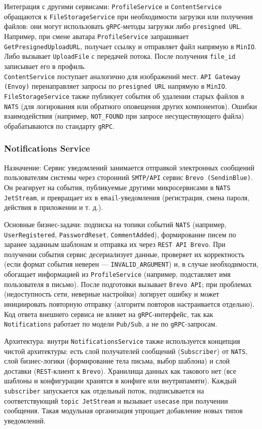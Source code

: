 Интеграция с другими сервисами: \texttt{ProfileService} и \texttt{ContentService} обращаются к \texttt{FileStorageService} при необходимости загрузки или получения файлов: они могут использовать \texttt{gRPC}-методы загрузки либо \texttt{presigned URL}. Например, при смене аватара \texttt{ProfileService} запрашивает \texttt{GetPresignedUploadURL}, получает ссылку и отправляет файл напрямую в \texttt{MinIO}. Либо вызывает \texttt{UploadFile} с передачей потока. После получения \texttt{file\_id} записывает его в профиль. \\ \texttt{ContentService} поступает аналогично для изображений мест. \texttt{API Gateway (Envoy)} перенаправляет запросы по \texttt{presigned URL} напрямую в \texttt{MinIO}. \texttt{FileStorageService} также публикует события об удалении старых файлов в \texttt{NATS} (для логирования или обратного оповещения других компонентов). Ошибки взаимодействия (например, \texttt{NOT\_FOUND} при запросе несуществующего файла) обрабатываются по стандарту \texttt{gRPC}.

\subsubsection*{Notifications Service}
Назначение: Сервис уведомлений занимается отправкой электронных сообщений пользователям системы через сторонний \texttt{SMTP/API} сервис \texttt{Brevo (SendinBlue)}. Он реагирует на события, публикуемые другими микросервисами в \texttt{NATS JetStream}, и превращает их в \texttt{email}-уведомления (регистрация, смена пароля, действия в приложении и т. д.).

Основные бизнес-задачи: подписка на топики событий \texttt{NATS} (например, \texttt{UserRegistered}, \texttt{PasswordReset}, \texttt{CommentAdded}), формирование писем по заранее заданным шаблонам и отправка их через \texttt{REST API Brevo}. При получении события сервис десериализует данные, проверяет их корректность (если формат события неверен — \texttt{INVALID\_ARGUMENT}) и, в случае необходимости, обогащает информацией из \texttt{ProfileService} (например, подставляет имя пользователя в письмо). После подготовки вызывает \texttt{Brevo API}; при проблемах (недоступность сети, неверные настройки) логирует ошибку и может инициировать повторную отправку (алгоритм повторов настраивается отдельно). Код ответа внешнего сервиса не влияет на \texttt{gRPC}-интерфейс, так как \texttt{Notifications} работает по модели \texttt{Pub/Sub}, а не по \texttt{gRPC}-запросам.

Архитектура: внутри \texttt{NotificationsService} также используется концепция чистой архитектуры: есть слой получателей сообщений (\texttt{Subscriber}) от \texttt{NATS}, слой бизнес-логики (формирование тела письма, выбор шаблона) и слой доставки (\texttt{REST}-клиент к \texttt{Brevo}). Хранилища данных как такового нет (все шаблоны и конфигурации хранятся в конфиге или внутрипамяти). Каждый \texttt{subscriber} запускается как отдельный поток, подписывается на соответствующий \texttt{topic JetStream} и вызывает \texttt{usecase} при получении сообщения. Такая модульная организация упрощает добавление новых типов уведомлений.

